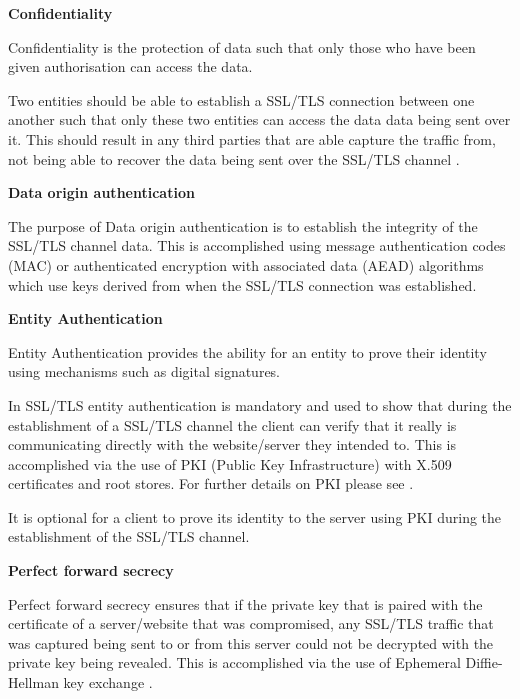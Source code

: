 \documentclass{mscreport}
\begin{document}
\vspace{0.7cm} \noindent
\textbf{Confidentiality}

\noindent
Confidentiality is the protection of data such that only those who have been given authorisation can access the data.

\vspace{0.3cm} \noindent
Two entities should be able to establish a SSL/TLS connection between one another such that only these two entities can access the data data being sent over it. This should result in any third parties that are able capture the traffic from, not being able to recover the data being sent over the SSL/TLS channel \cite{Martin2017-sx}.

\vspace{0.7cm} \noindent
\textbf{Data origin authentication}

\noindent
The purpose of Data origin authentication is to establish the integrity of the SSL/TLS channel data. This is accomplished using message authentication codes (MAC)  or authenticated encryption with associated data (AEAD) algorithms \cite{Ristic2017-aj} which use keys derived from when the SSL/TLS connection was established.

\vspace{0.7cm} \noindent
\textbf{Entity Authentication}

\noindent
Entity Authentication provides the ability for an entity to prove their identity using mechanisms such as digital signatures.

\vspace{0.3cm} \noindent
In SSL/TLS entity authentication is mandatory and used to show that during the establishment of a SSL/TLS channel the client can verify that it really is communicating directly with the website/server they intended to. This is accomplished via the use of PKI (Public Key Infrastructure) with X.509 certificates and root stores. For further details on PKI please see \cite{Clark2013-sh,Holz2011-yv}.

\vspace{0.3cm} \noindent
It is optional for a client to prove its identity to the server using PKI during the establishment of the SSL/TLS channel.

\vspace{0.7cm} \noindent
\textbf{Perfect forward secrecy}

\noindent
Perfect forward secrecy ensures that if the private key that is paired with the certificate of a server/website that was compromised, any SSL/TLS traffic that was captured being sent to or from this server could not be decrypted with the private key being revealed. This is accomplished via the use of Ephemeral Diffie-Hellman key exchange \cite{Martin2017-sx}.
\end{document}
